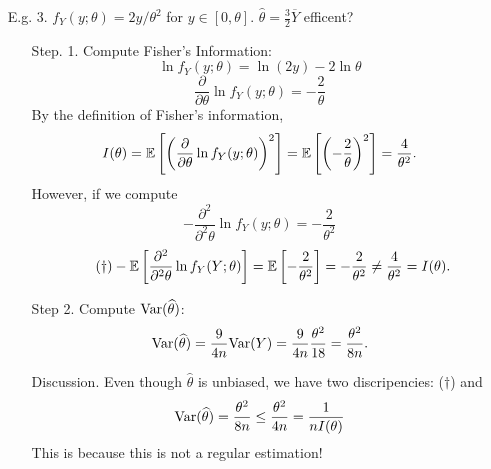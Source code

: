 \begin{frame}[label=current]

\begin{enumerate}
 \item[E.g. 3.] $f_Y(y;\theta)=2y/\theta^2$ for $y\in [0,\theta]$.  $\widehat{\theta}=\frac32\overline{Y}$ efficent?\\[1em]
 \begin{itemize}
  \item[Step. 1.] Compute Fisher's Information:
  \[
 \ln f_Y(y;\theta) = \ln (2y)-2\ln\theta
 \]\pause
 \[
 \frac{\partial}{\partial \theta} \ln f_Y(y;\theta) = -\frac{2}{\theta}
 \]\pause
 By the definition of Fisher's information,
 \[
 I(\theta) = \mathbb{E}\left[\left(\frac{\partial}{\partial \theta} \ln f_Y(y;\theta) \right)^2\right]=
 \mathbb{E}\left[\left( - \frac{2}{\theta}  \right)^2\right]= \frac{4}{\theta^2}.
 \] \pause
 However, if we compute
 \[
 -\frac{\partial^2}{\partial^2 \theta} \ln f_Y(y;\theta) = -\frac{2}{\theta^2}
 \]\pause
 \begin{align}\tag{$\dagger$}
 -\mathbb{E}\left[\frac{\partial^2}{\partial^2 \theta} \ln f_Y(Y;\theta)\right]
 = \mathbb{E}\left[-\frac{2}{\theta^2} \right]
 =-\frac{2}{\theta^2} \ne
\frac{4}{\theta^2} = I(\theta) .
 \end{align}
\pause
 \item[Step 2.] Compute $\text{Var}(\widehat{\theta})$:
 \[
 \text{Var}(\widehat\theta) = \frac{9}{4n}\text{Var}(Y) =  \frac{9}{4 n} \frac{\theta^2}{18} = \frac{\theta^2}{8n}.
 \]
 \item[Discussion.] Even though $\widehat\theta$ is unbiased, we have two discripencies: ($\dagger$)  and
 \[
 \text{Var}(\widehat\theta)= \frac{\theta^2}{8n} \le \frac{\theta^2}{4n} = \frac{1}{n I(\theta)}
 \]\pause
 This is because this is not a regular estimation!
 \end{itemize}
\end{enumerate}


\end{frame}
